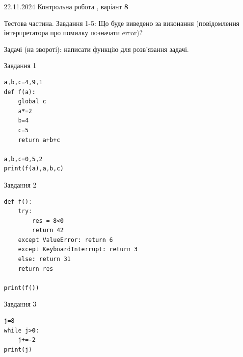 \documentclass[12pt, ukrainian]{article}
\begin{document}
{{{{{{{\newpage

{{22.11.2024 Контрольна робота , варіант  \No \textbf { 8 }\par}}
{

Тестова частина. Завдання 1-5: Що буде виведено за виконання (повідомлення інтерпретатора про помилку позначати error)?

Задачі (на звороті): написати функцію для розв'язання задачі.

\vspace{5mm} \begin{minipage}[t]{8.5cm}
               
{\begin{center}Завдання {1}\end{center}}
\vspace{-6mm}

\begin{verbatim}
a,b,c=4,9,1
def f(a):
    global c
    a*=2
    b=4
    c=5
    return a+b+c

a,b,c=0,5,2
print(f(a),a,b,c)
\end{verbatim}


\vspace{5mm}
               
{\begin{center}Завдання {2}\end{center}}
\vspace{-6mm}

\begin{verbatim}
def f():
    try:
        res = 8<0
        return 42
    except ValueError: return 6
    except KeyboardInterrupt: return 3
    else: return 31
    return res

print(f())
\end{verbatim}


\vspace{5mm}
               
{\begin{center}Завдання {3}\end{center}}
\vspace{-6mm}

\begin{verbatim}
j=8
while j>0:
    j+=-2
print(j)
\end{verbatim}


\end{minipage}
\vline \hspace{6mm}
\begin{minipage}[t]{10.7cm}
               

\end{minipage}}}}}}}}}
\end{document}
